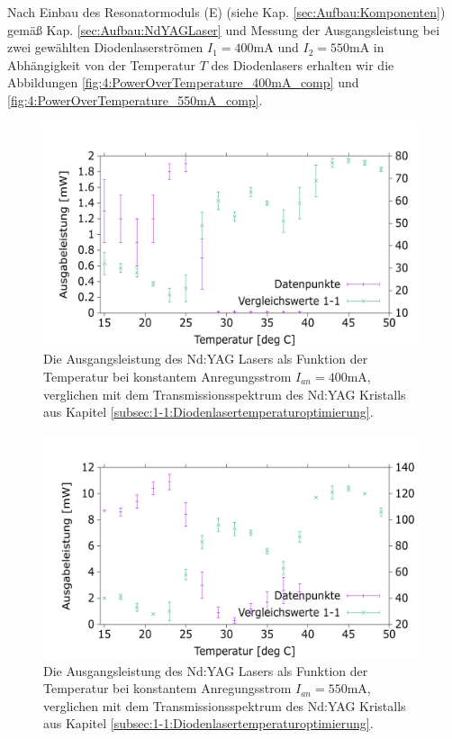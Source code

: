 \documentclass[../../main.tex]{subfiles}
\begin{document}
    
    Nach Einbau des Resonatormoduls (E) (siehe Kap. \ref{sec:Aufbau:Komponenten}) gemäß Kap. \ref{sec:Aufbau:NdYAGLaser} und Messung der Ausgangsleistung bei zwei gewählten Diodenlaserströmen $I_1 = 400\si{\mA}$ und $I_2 = 550\si{\mA}$ in Abhängigkeit von der Temperatur $T$ des Diodenlasers erhalten wir die Abbildungen \ref{fig:4:PowerOverTemperature_400mA_comp} und \ref{fig:4:PowerOverTemperature_550mA_comp}.


    \begin{figure}[H]
        \centering
        \includegraphics[width=11cm]{../../Bilddateien/4/PowerOverTemperature_400mA_comp.png}
        \caption{Die Ausgangsleistung des Nd:YAG Lasers als Funktion der Temperatur bei konstantem Anregungsstrom $I_{\textit{an}} = 400\si{\mA}$, verglichen mit dem Transmissionsspektrum des Nd:YAG Kristalls aus Kapitel \ref{subsec:1-1:Diodenlasertemperaturoptimierung}.}
    \end{figure}

    \begin{figure}[H]
        \centering
        \includegraphics[width=11cm]{../../Bilddateien/4/PowerOverTemperature_550mA_comp.png}
        \caption{Die Ausgangsleistung des Nd:YAG Lasers als Funktion der Temperatur bei konstantem Anregungsstrom $I_{\textit{an}} = 550\si{\mA}$, verglichen mit dem Transmissionsspektrum des Nd:YAG Kristalls aus Kapitel \ref{subsec:1-1:Diodenlasertemperaturoptimierung}.}
    \end{figure}
\end{document}
